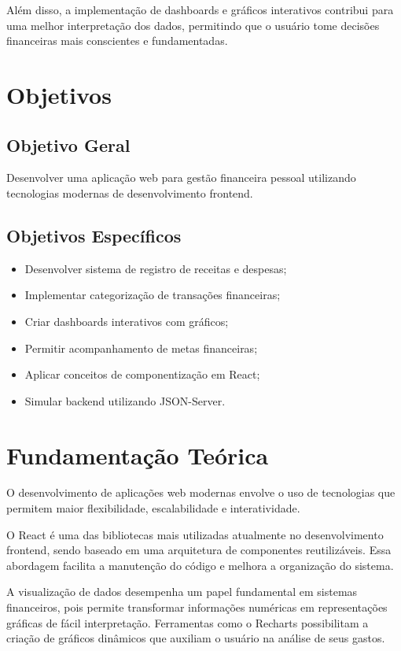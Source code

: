 \documentclass[12pt,oneside,a4paper,chapter=TITLE]{abntex2}
\begin{document}
Além disso, a implementação de dashboards e gráficos interativos contribui para uma melhor interpretação dos dados, permitindo que o usuário tome decisões financeiras mais conscientes e fundamentadas.


\chapter{Objetivos}

\section{Objetivo Geral}

Desenvolver uma aplicação web para gestão financeira pessoal utilizando tecnologias modernas de desenvolvimento frontend.

\section{Objetivos Específicos}

\begin{itemize}
\item Desenvolver sistema de registro de receitas e despesas;
\item Implementar categorização de transações financeiras;
\item Criar dashboards interativos com gráficos;
\item Permitir acompanhamento de metas financeiras;
\item Aplicar conceitos de componentização em React;
\item Simular backend utilizando JSON-Server.
\end{itemize}


\chapter{Fundamentação Teórica}

O desenvolvimento de aplicações web modernas envolve o uso de tecnologias que permitem maior flexibilidade, escalabilidade e interatividade.

O React é uma das bibliotecas mais utilizadas atualmente no desenvolvimento frontend, sendo baseado em uma arquitetura de componentes reutilizáveis. Essa abordagem facilita a manutenção do código e melhora a organização do sistema.

A visualização de dados desempenha um papel fundamental em sistemas financeiros, pois permite transformar informações numéricas em representações gráficas de fácil interpretação. Ferramentas como o Recharts possibilitam a criação de gráficos dinâmicos que auxiliam o usuário na análise de seus gastos.
\end{document}
